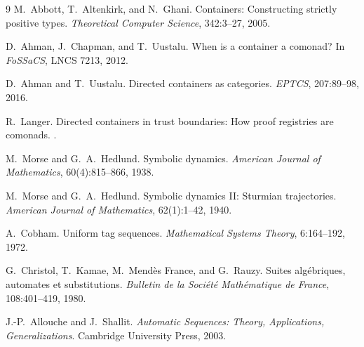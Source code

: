\documentclass[11pt, a4paper]{article}
\theoremstyle{definition}
\theoremstyle{plain}
\begin{document}
\begin{thebibliography}{9}
M.~Abbott, T.~Altenkirk, and N.~Ghani.
\newblock Containers: Constructing strictly positive types.
\newblock \emph{Theoretical Computer Science}, 342:3--27, 2005.

D.~Ahman, J.~Chapman, and T.~Uustalu.
\newblock When is a container a comonad?
\newblock In \emph{FoSSaCS}, LNCS 7213, 2012.

D.~Ahman and T.~Uustalu.
\newblock Directed containers as categories.
\newblock \emph{EPTCS}, 207:89--98, 2016.

R.~Langer.
\newblock Directed containers in trust boundaries: How proof registries are
  comonads.
.

M.~Morse and G.~A.~Hedlund.
\newblock Symbolic dynamics.
\newblock \emph{American Journal of Mathematics}, 60(4):815--866, 1938.

M.~Morse and G.~A.~Hedlund.
\newblock Symbolic dynamics II: Sturmian trajectories.
\newblock \emph{American Journal of Mathematics}, 62(1):1--42, 1940.

A.~Cobham.
\newblock Uniform tag sequences.
\newblock \emph{Mathematical Systems Theory}, 6:164--192, 1972.

G.~Christol, T.~Kamae, M.~Mend\`es France, and G.~Rauzy.
\newblock Suites alg\'ebriques, automates et substitutions.
\newblock \emph{Bulletin de la Soci\'et\'e Math\'ematique de France},
  108:401--419, 1980.

J.-P.~Allouche and J.~Shallit.
\newblock \emph{Automatic Sequences: Theory, Applications,
  Generalizations}.
\newblock Cambridge University Press, 2003.
\end{thebibliography}
\end{document}
